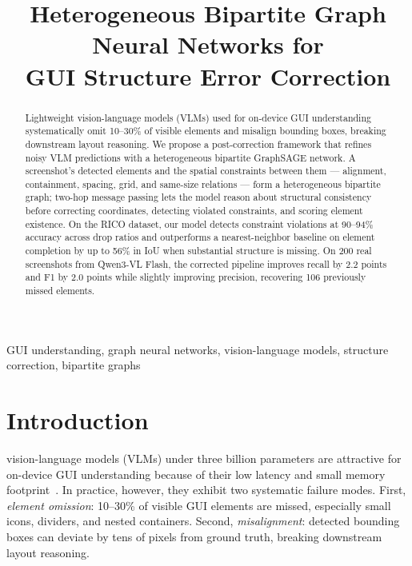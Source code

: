 \documentclass[conference]{IEEEtran}
\begin{document}
\title{Heterogeneous Bipartite Graph Neural Networks for \\
GUI Structure Error Correction}

\author{
\and
{}
}

\maketitle

\begin{abstract}
Lightweight vision-language models (VLMs) used for on-device GUI understanding
systematically omit 10--30\% of visible elements and misalign bounding boxes,
breaking downstream layout reasoning. We propose a post-correction framework
that refines noisy VLM predictions with a heterogeneous bipartite GraphSAGE
network. A screenshot's detected elements and the spatial constraints between
them --- alignment, containment, spacing, grid, and same-size relations ---
form a heterogeneous bipartite graph; two-hop message passing lets the model
reason about structural consistency before correcting coordinates, detecting
violated constraints, and scoring element existence. On the RICO dataset, our
model detects constraint violations at 90--94\% accuracy across drop ratios and
outperforms a nearest-neighbor baseline on element completion by up to 56\% in
IoU when substantial structure is missing. On 200 real screenshots from
Qwen3-VL Flash, the corrected pipeline improves recall by 2.2 points and F1 by
2.0 points while slightly improving precision, recovering 106 previously
missed elements.
\end{abstract}

\begin{IEEEkeywords}
GUI understanding, graph neural networks, vision-language models,
structure correction, bipartite graphs
\end{IEEEkeywords}

\section{Introduction}
 vision-language models (VLMs) under three billion
parameters are attractive for on-device GUI understanding because of their low
latency and small memory footprint~\cite{bai2023qwen}. In practice, however,
they exhibit two systematic failure modes. First, \emph{element omission}:
10--30\% of visible GUI elements are missed, especially small icons, dividers,
and nested containers. Second, \emph{misalignment}: detected bounding boxes
can deviate by tens of pixels from ground truth, breaking downstream layout
reasoning.
\end{document}
